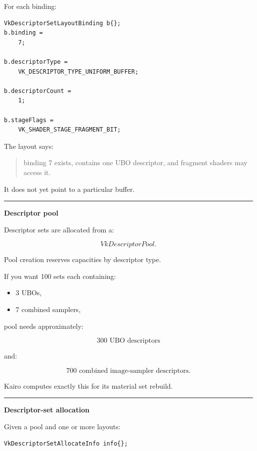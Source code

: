 For each binding:

\begin{verbatim}
VkDescriptorSetLayoutBinding b{};
b.binding =
    7;

b.descriptorType =
    VK_DESCRIPTOR_TYPE_UNIFORM_BUFFER;

b.descriptorCount =
    1;

b.stageFlags =
    VK_SHADER_STAGE_FRAGMENT_BIT;
\end{verbatim}

The layout says:

\begin{quote}
binding 7 exists, contains one UBO descriptor, and fragment shaders may access it.
\end{quote}

It does not yet point to a particular buffer.

\begin{center}\rule{0.5\linewidth}{0.5pt}\end{center}

\textbf{Descriptor pool}

Descriptor sets are allocated from a:

\[
VkDescriptorPool.
\]

Pool creation reserves capacities by descriptor type.

If you want 100 sets each containing:

\begin{itemize}
\tightlist
\item
  3 UBOs,
\item
  7 combined samplers,
\end{itemize}

pool needs approximately:

\[
300\text{ UBO descriptors}
\]

and:

\[
700\text{ combined image-sampler descriptors}.
\]

Kairo computes exactly this for its material set rebuild.

\begin{center}\rule{0.5\linewidth}{0.5pt}\end{center}

\textbf{Descriptor-set allocation}

Given a pool and one or more layouts:

\begin{verbatim}
VkDescriptorSetAllocateInfo info{};
\end{verbatim}

